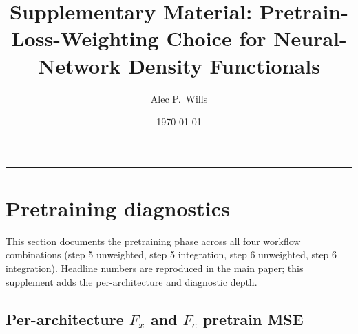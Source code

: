 \documentclass[11pt,letterpaper]{article}
\title{Supplementary Material: Pretrain-Loss-Weighting Choice for
       Neural-Network Density Functionals}
\author{Alec P.\ Wills}
\date{\today}
\begin{document}
\maketitle

\tableofcontents
\bigskip\hrule\bigskip

\section{Pretraining diagnostics}
\label{S:sec:pretraining}

This section documents the pretraining phase across all four workflow
combinations (step 5 unweighted, step 5 integration, step 6 unweighted,
step 6 integration). Headline numbers are reproduced in the main paper;
this supplement adds the per-architecture and diagnostic depth.

\subsection{Per-architecture $F_x$ and $F_c$ pretrain MSE}
\label{S:sec:pretrain_per_arch}
\end{document}
